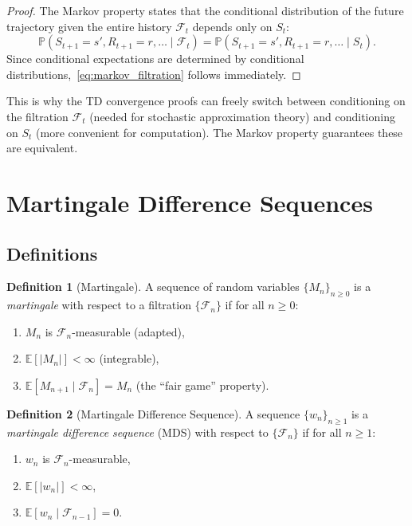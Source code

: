 \documentclass[11pt,a4paper]{article}
\theoremstyle{definition}
\newtheorem{definition}{Definition}[section]
\theoremstyle{plain}
\theoremstyle{remark}
\newcommand{\E}{\mathbb{E}}
\newcommand{\Prob}{\mathbb{P}}
\begin{document}
\begin{proof}
The Markov property states that the conditional distribution of the future trajectory given the entire history $\mathcal{F}_t$ depends only on $S_t$:
\begin{equation}
    \Prob(S_{t+1} = s', R_{t+1} = r, \ldots \mid \mathcal{F}_t) = \Prob(S_{t+1} = s', R_{t+1} = r, \ldots \mid S_t).
\end{equation}
Since conditional expectations are determined by conditional distributions,~\eqref{eq:markov_filtration} follows immediately.
\end{proof}

\begin{rlconnection}[Connection to RL]
This is why the TD convergence proofs can freely switch between conditioning on the filtration $\mathcal{F}_t$ (needed for stochastic approximation theory) and conditioning on $S_t$ (more convenient for computation). The Markov property guarantees these are equivalent.
\end{rlconnection}

\section{Martingale Difference Sequences}
\label{sec:mds}

\subsection{Definitions}
\label{subsec:mds_def}

\begin{definition}[Martingale]
\label{def:martingale}
A sequence of random variables $\{M_n\}_{n \geq 0}$ is a \emph{martingale} with respect to a filtration $\{\mathcal{F}_n\}$ if for all $n \geq 0$:
\begin{enumerate}[nosep]
    \item $M_n$ is $\mathcal{F}_n$-measurable (adapted),
    \item $\E[|M_n|] < \infty$ (integrable),
    \item $\E[M_{n+1} \mid \mathcal{F}_n] = M_n$ (the ``fair game'' property).
\end{enumerate}
\end{definition}

\begin{definition}[Martingale Difference Sequence]
\label{def:mds}
A sequence $\{w_n\}_{n \geq 1}$ is a \emph{martingale difference sequence} (MDS) with respect to $\{\mathcal{F}_n\}$ if for all $n \geq 1$:
\begin{enumerate}[nosep]
    \item $w_n$ is $\mathcal{F}_n$-measurable,
    \item $\E[|w_n|] < \infty$,
    \item $\E[w_n \mid \mathcal{F}_{n-1}] = 0$.
\end{enumerate}
\end{definition}
\end{document}
